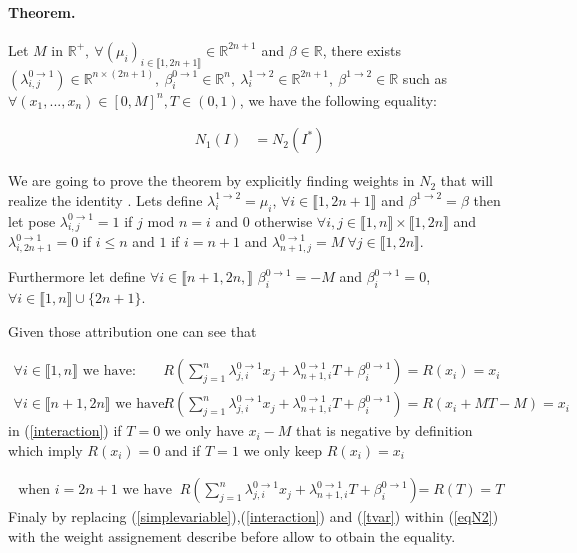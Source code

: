\documentclass{article}
\begin{document}
\paragraph{Theorem.}

Let $M$ in $\mathbb{R}^{+},~  \forall(\mu_{i})_{i \in \llbracket 1,2n+1 \rrbracket } \in \mathbb{R}^{2n+1}$ and $\beta \in \mathbb{R}$, there exists $(\lambda^{0 \rightarrow 1}_{i,j})\in \mathbb{R}^{n\times(2n+1)}, ~\beta^{0 \rightarrow 1}_{i} \in \mathbb{R}^{n},~\lambda^{1 \rightarrow 2}_{i}\in \mathbb{R}^{2n+1},~\beta^{1 \rightarrow 2} \in \mathbb{R}$ such as $\forall (x_1,...,x_n) \in \left[0, M \right]^{n}, T \in (0,1)$, we have the following equality:

\begin{align}
N_1(I) &=N_2(I^{*})
\end{align}


We are going to prove the theorem by explicitly finding weights in $N_2$ that will realize the identity . Lets define $\lambda^{1 \rightarrow 2}_{i} = \mu_i$, $\forall i \in \llbracket 1, 2n+1 \rrbracket$ and $\beta^{1 \rightarrow 2} = \beta$ 
then let pose $\lambda^{0 \rightarrow 1}_{i,j} = 1 $ if $ j$ mod $ n = i$ and $0$ otherwise $\forall i,j \in \llbracket 1, n\rrbracket \times \llbracket 1,2n \rrbracket$ and $\lambda^{0 \rightarrow 1}_{i,2n+1} =0 $ if $i \leq n$ and $1$ if $i = n+1$ and $\lambda^{0 \rightarrow 1}_{n+1,j} = M~ \forall j \in \llbracket 1,2n\rrbracket $.

Furthermore let define  $\forall i \in \llbracket n+1,2n,\rrbracket$ $\beta^{0 \rightarrow 1}_{i} = -M$ and $\beta^{0 \rightarrow 1}_{i} =0$, $\forall i \in \llbracket 1,n\rrbracket \cup \{2n+1\}$. 

Given those attribution one can see that 

\begin{align}
\forall i \in \llbracket 1, n \rrbracket \text{ we have: } & R( \sum_{j=1}^{n} \lambda^{0 \rightarrow 1}_{j,i} x_j +\lambda^{0 \rightarrow 1}_{n+1,i} T +\beta^{0 \rightarrow 1}_{i}) =  R(x_i) = x_i \label{simplevariable}  \\
\forall i \in \llbracket n+1, 2n \rrbracket \text{ we have: }&R( \sum_{j=1}^{n} \lambda^{0 \rightarrow 1}_{j,i} x_j +\lambda^{0 \rightarrow 1}_{n+1,i} T +\beta^{0 \rightarrow 1}_{i}) =  R(x_i + MT -M) = x_i \label{interaction} 
\end{align}
in (\ref{interaction}) if $T =0$ we only have $x_i - M$ that is negative by definition which imply $R(x_i) = 0$ and if $T = 1$ we only keep $R(x_i) = x_i$

\begin{align}
\text{ when } i = 2n+1 \text{ we have }~R( \sum_{j=1}^{n} \lambda^{0 \rightarrow 1}_{j,i} x_j +\lambda^{0 \rightarrow 1}_{n+1,i} T +\beta^{0 \rightarrow 1}_{i}) &=  R(T) =T~\label{tvar} 
\end{align}
Finaly by replacing (\ref{simplevariable}),(\ref{interaction}) and (\ref{tvar}) within (\ref{eqN2}) with the weight assignement describe before allow to otbain the equality.
\end{document}
